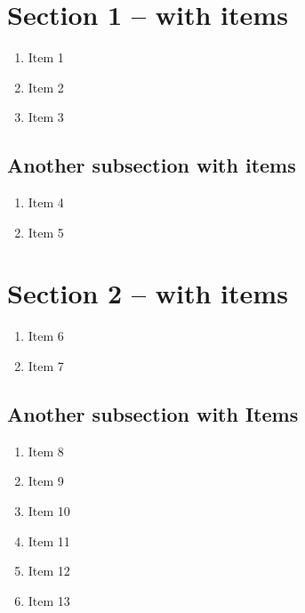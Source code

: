 \documentclass{article}
\begin{document}
\tableofcontents

\section{Section 1 -- with  items}
    \begin{enumerate}[resume]
        \item Item 1
        \item Item 2
        \item Item 3
    \end{enumerate}

\subsection{Another subsection with  items}

\begin{enumerate}[resume]
\item Item 4
\item Item 5
\end{enumerate}


\section{Section 2 -- with  items}
\begin{enumerate}[resume]
\item Item 6
\item Item 7
\end{enumerate}

\subsection{Another subsection with  Items } %

\begin{enumerate}[resume]
\item Item 8
\item Item 9
\item Item 10
\item Item 11
\item Item 12
\item Item 13
\end{enumerate}
\end{document}
